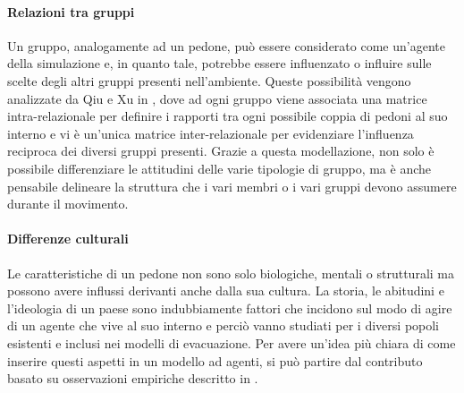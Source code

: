 \paragraph{Relazioni tra gruppi}
Un gruppo, analogamente ad un pedone, può essere considerato come un’agente della simulazione e, in quanto tale, potrebbe essere influenzato o influire sulle scelte degli altri gruppi presenti nell'ambiente. \newline
Queste possibilità vengono analizzate da Qiu e Xu in \cite{Qiu2010}, dove ad ogni gruppo viene associata una matrice intra-relazionale per definire i rapporti tra ogni possibile coppia di pedoni al suo interno e vi è un’unica matrice inter-relazionale per evidenziare l’influenza reciproca dei diversi gruppi presenti. \newline
Grazie a questa modellazione, non solo è possibile differenziare le attitudini delle varie tipologie di gruppo, ma è anche pensabile delineare la struttura che i vari membri o i vari gruppi devono assumere durante il movimento.

\paragraph{Differenze culturali}
Le caratteristiche di un pedone non sono solo biologiche, mentali o strutturali ma possono avere influssi derivanti anche dalla sua cultura. \newline
La storia, le abitudini e l'ideologia di un paese sono indubbiamente fattori che incidono sul modo di agire di un agente che vive al suo interno e perciò vanno studiati per i diversi popoli esistenti e inclusi nei modelli di evacuazione. \newline
Per avere un'idea più chiara di come inserire questi aspetti in un modello ad agenti, si può partire dal contributo basato su osservazioni empiriche descritto in \cite{Fridman2013}.